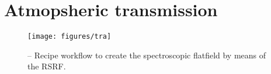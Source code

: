 % 
\section{Atmopsheric transmission}
\label{app:atmo_trans}

\begin{figure}[ht]
  \centering
  \texttt{[image: figures/tra]}
  \caption[Recipe: ]{ --
    Recipe workflow to create the spectroscopic flatfield by means of the \ac{RSRF}.}
  \label{Fig:rec_lm_lss_rsrf}
\end{figure}